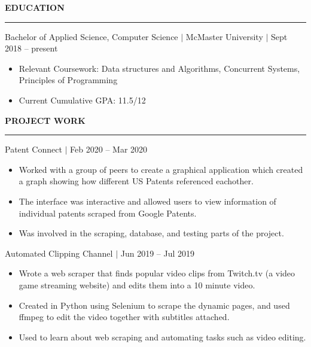 \documentclass[12pt]{article}
\newcommand{\sectionRule}{\textcolor{gray}{\rule{7.27in}{0.02cm}}}
\newcommand{\sectionTxt}[1]{\noindent\textbf{#1}\\}
\newcommand{\textDate}[3]{\noindent#1 $|$ #2 $|$ {\color{textGray} #3}}
\newcommand{\projText}[2]{\noindent#1 $|$ {\color{textGray} #2}}
\begin{document}
    \sectionTxt{EDUCATION}
    \sectionRule

    \textDate{Bachelor of Applied Science, Computer Science}{McMaster University}{Sept 2018 -- present}
    \begin{small}
        \begin{itemize}
            \item Relevant Coursework: {\color{textGray} Data structures and Algorithms, Concurrent Systems, Principles of Programming}
            \item Current Cumulative GPA: {\color{textGray} 11.5/12}
        \end{itemize}
    \end{small}

    \sectionTxt{PROJECT WORK}
    \sectionRule


    \projText{Patent Connect}{Feb 2020 -- Mar 2020}
    \begin{small}
        \begin{itemize}
            
            \item {\color{textGray} Worked with a group of peers to create a graphical application which created a graph showing how different US Patents referenced eachother.}
            \item {\color{textGray} The interface was interactive and allowed users to view information of individual patents scraped from Google Patents.}
            \item {\color{textGray} Was involved in the scraping, database, and testing parts of the project.}
        \end{itemize}
    \end{small}
    \projText{Automated Clipping Channel}{Jun 2019 -- Jul 2019}
    \begin{small}
        \begin{itemize}
            \item {\color{textGray} Wrote a web scraper that finds popular video clips from Twitch.tv (a video game streaming website) and edits them into a 10 minute video.}
            \item {\color{textGray} Created in Python using Selenium to scrape the dynamic pages, and used ffmpeg to edit the video together with subtitles attached.}
            \item {\color{textGray} Used to learn about web scraping and automating tasks such as video editing.}
        \end{itemize}
    \end{small}
\end{document}
